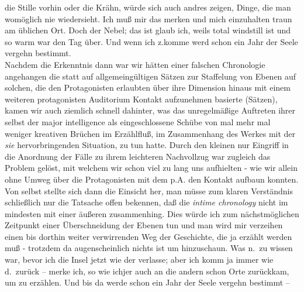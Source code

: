 \documentclass[
]{article}
\begin{document}
die Stille vorhin oder die Krähn, würde sich auch andres zeigen, Dinge,
die man womöglich nie wiedersieht. Ich muß mir das merken und mich
einzuhalten traun am üblichen Ort. Doch der Nebel; das ist glaub ich,
weils total windstill ist und so warm war den Tag über. Und wenn ich
z.komme werd schon ein Jahr der Seele vergehn bestimmt.\\
Nachdem die Erkenntnis dann war wir hätten einer falschen Chronologie
angehangen die statt auf allgemeingültigen Sätzen zur Staffelung von
Ebenen auf solchen, die den Protagonisten erlaubten über ihre Dimension
hinaus mit einem weiteren protagonisten Auditorium Kontakt aufzunehmen
basierte (Sätzen), kamen wir auch ziemlich schnell dahinter, was das
unregelmäßige Auftreten ihrer selbst der major intelligence als
eingeschlossene Schübe von mal mehr mal weniger kreativen Brüchen im
Erzählfluß, im Zusammenhang des Werkes mit der \emph{sie
}hervorbringenden Situation, zu tun hatte. Durch den kleinen nur
Eingriff in die Anordnung der Fälle zu ihrem leichteren Nachvollzug war
zugleich das Problem gelöst, mit welchem wir schon viel zu lang uns
aufhielten - wie wir allein ohne Umweg über die Protagonisten mit dem
p.A. den Kontakt aufbaun konnten. Von selbst stellte sich dann die
Einsicht her, man müsse zum klaren Verständnis schließlich nur die
Tatsache offen bekennen, daß die \emph{intime chronology} nicht im
mindesten mit einer äußeren zusammenhing. Dies würde ich zum
nächstmöglichen Zeitpunkt einer Überschneidung der Ebenen tun und man
wird mir verzeihen einen bis dorthin weiter verwirrenden Weg der
Geschichte, die ja erzählt werden muß - trotzdem da augenscheinlich
nichts ist um hinzuschaun. Was n.~zu wissen war, bevor ich die Insel
jetzt wie der verlasse; aber ich komm ja immer wie d.~zurück -- merke
ich, so wie ichjer auch an die andern schon Orte zurückkam, um zu
erzählen. Und bis da werde schon ein Jahr der Seele vergehn bestimmt --
\end{document}
